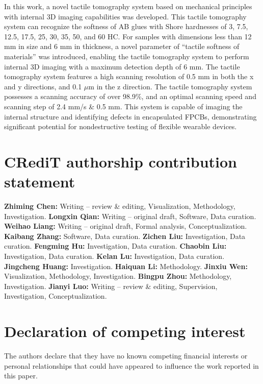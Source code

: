 \documentclass[11pt]{article}
\begin{document}
In this work, a novel tactile tomography system based on mechanical
principles with internal 3D imaging capabilities was developed.
This tactile tomography system can recognize the softness of AB
glues with Shore hardnesses of 3, 7.5, 12.5, 17.5, 25, 30, 35, 50,
and 60 HC. For samples with dimensions less than 12 mm in size and
6 mm in thickness, a novel parameter of ``tactile softness of
materials'' was introduced, enabling the tactile tomography system
to perform internal 3D imaging with a maximum detection depth of 6
mm. The tactile tomography system features a high scanning
resolution of 0.5 mm in both the x and y directions, and 0.1
$\mu$m in the z direction. The tactile tomography system possesses
a scanning accuracy of over 98.9\%, and an optimal scanning speed
and scanning step of 2.4 mm/s \& 0.5 mm. This system is capable of
imaging the internal structure and identifying defects in
encapsulated FPCBs, demonstrating significant potential for
nondestructive testing of flexible wearable devices.

\section*{CRediT authorship contribution statement}

\textbf{Zhiming Chen:} Writing -- review \& editing,
Visualization, Methodology, Investigation.
\textbf{Longxin Qian:} Writing -- original draft, Software, Data
curation.
\textbf{Weihao Liang:} Writing -- original draft, Formal analysis,
Conceptualization.
\textbf{Kaibang Zhang:} Software, Data curation.
\textbf{Zichen Liu:} Investigation, Data curation.
\textbf{Fengming Hu:} Investigation, Data curation.
\textbf{Chaobin Liu:} Investigation, Data curation.
\textbf{Kelan Lu:} Investigation, Data curation.
\textbf{Jingcheng Huang:} Investigation.
\textbf{Haiquan Li:} Methodology.
\textbf{Jinxiu Wen:} Visualization, Methodology, Investigation.
\textbf{Bingpu Zhou:} Methodology, Investigation.
\textbf{Jianyi Luo:} Writing -- review \& editing, Supervision,
Investigation, Conceptualization.

\section*{Declaration of competing interest}

The authors declare that they have no known competing financial
interests or personal relationships that could have appeared to
influence the work reported in this paper.
\end{document}
